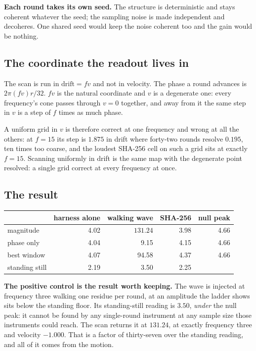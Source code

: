 \textbf{Each round takes its own seed.} The structure is deterministic and stays coherent whatever
the seed; the sampling noise is made independent and decoheres. One shared seed would keep the
noise coherent too and the gain would be nothing.

\subsection{The coordinate the readout lives in}

The scan is run in \(\text{drift} = f v\) and not in velocity. The phase a round advances is
\(2 \pi (f v) r / 32\). \(fv\) is the natural coordinate and \(v\) is a degenerate one: every
frequency's cone passes through \(v = 0\) together, and away from it the same step in \(v\) is a
step of \(f\) times as much phase.

A uniform grid in \(v\) is therefore correct at one frequency and wrong at all the others: at
\(f = 15\) its step is \(1.875\) in drift where forty-two rounds resolve \(0.195\), ten times too
coarse, and the loudest SHA-256 cell on such a grid sits at exactly \(f = 15\). Scanning uniformly
in drift is the same map with the degenerate point resolved: a single grid correct at every
frequency at once.

\subsection{The result}

\begin{center}
\begin{tabular}{lrrrr}
\toprule
 & harness alone & walking wave & SHA-256 & null peak \\
\midrule
magnitude & 4.02 & \(\mathbf{131.24}\) & 3.98 & 4.66 \\
phase only & 4.04 & 9.15 & 4.15 & 4.66 \\
best window & 4.07 & 94.58 & 4.37 & 4.66 \\
standing still & 2.19 & 3.50 & 2.25 & \textemdash{} \\
\bottomrule
\end{tabular}
\end{center}

\textbf{The positive control is the result worth keeping.} The wave is injected at frequency three
walking one residue per round, at an amplitude the ladder shows sits below the standing floor. Its
standing-still reading is \(3.50\), \emph{under} the null peak: it cannot be found by any
single-round instrument at any sample size those instruments could reach. The scan returns it at
\(131.24\), at exactly frequency three and velocity \(-1.000\). That is a factor of thirty-seven
over the standing reading, and all of it comes from the motion.

